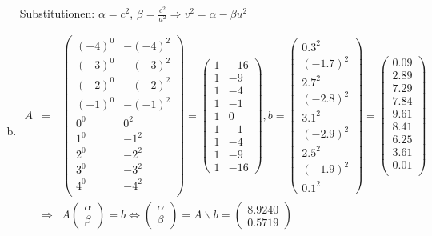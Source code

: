 \documentclass[11pt]{article} %
\begin{document}
\begin{enumerate}[a)]
Substitutionen: $\alpha = c^2$, $\beta = \frac{c^2}{a^2} \Rightarrow v^2 = \alpha - \beta u^2$
\item
\begin{eqnarray*}
A &=& \begin{pmatrix}
	(-4)^0 & -(-4)^2 \\
	(-3)^0 & -(-3)^2 \\
	(-2)^0 & -(-2)^2 \\
	(-1)^0 & -(-1)^2 \\
	0^0 & 0^2 \\
	1^0 & -1^2 \\
	2^0 & -2^2 \\
	3^0 & -3^2 \\
	4^0 & -4^2 \\
\end{pmatrix} = \begin{pmatrix} 1 & -16 \\ 1 & -9 \\ 1 & -4 \\ 1 & -1 \\ 1 & 0 \\ 1 & -1 \\ 1 & -4 \\ 1 & -9 \\ 1 & -16 \end{pmatrix},
b = \begin{pmatrix} 0.3^2 \\ (-1.7)^2 \\ 2.7^2 \\ (-2.8)^2 \\ 3.1^2 \\ (-2.9)^2 \\ 2.5^2 \\ (-1.9)^2 \\ 0.1^2 \end{pmatrix} = \begin{pmatrix} 0.09\\
    2.89\\
    7.29\\
    7.84\\
    9.61\\
    8.41\\
    6.25\\
    3.61\\
    0.01\\ \end{pmatrix} \\
&\Rightarrow& A\begin{pmatrix}\alpha \\ \beta\end{pmatrix} = b \Leftrightarrow  \begin{pmatrix}\alpha \\ \beta\end{pmatrix} = A\backslash b = \begin{pmatrix}  8.9240 \\ 0.5719\end{pmatrix}
\end{eqnarray*}


\end{enumerate}
\end{document}
